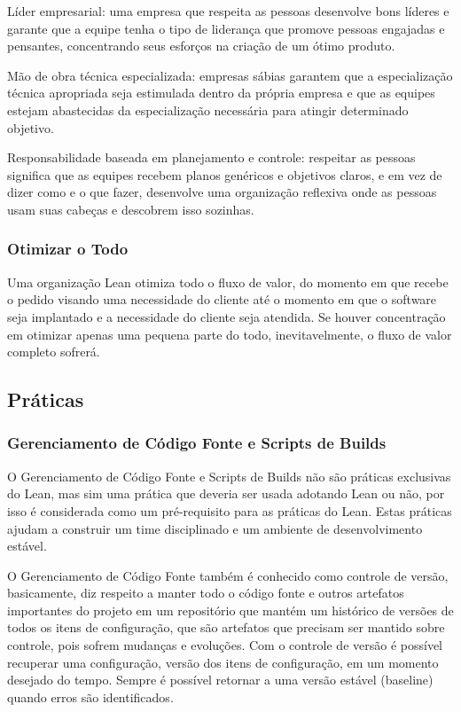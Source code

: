 Líder empresarial: uma empresa que respeita as pessoas desenvolve bons líderes e garante que a equipe tenha o tipo de liderança que promove pessoas engajadas e pensantes, concentrando seus esforços na criação de um ótimo produto.

Mão de obra técnica especializada: empresas sábias garantem que a especialização técnica apropriada seja estimulada dentro da própria empresa e que as equipes estejam abastecidas da especialização necessária para atingir determinado objetivo.

Responsabilidade baseada em planejamento e controle: respeitar as pessoas significa que as equipes recebem planos genéricos e objetivos claros, e em vez de dizer como e o que fazer, desenvolve uma organização reflexiva onde as pessoas usam suas cabeças e descobrem isso sozinhas.

\subsubsection[Otimizar o Todo]{Otimizar o Todo}

Uma organização Lean otimiza todo o fluxo de valor, do momento em que recebe o pedido visando uma necessidade do cliente até o momento em que o software seja implantado e a necessidade do cliente seja atendida. Se houver concentração em otimizar apenas uma pequena parte do todo, inevitavelmente, o fluxo de valor completo sofrerá. 

\subsection[ Práticas]{ Práticas}

\subsubsection[Gerenciamento de Código Fonte e Scripts de Builds]{Gerenciamento de Código Fonte e Scripts de Builds}

O Gerenciamento de Código Fonte e Scripts de Builds não são práticas exclusivas do Lean, mas sim uma prática que deveria ser usada adotando Lean ou não, por isso é considerada como um pré-requisito para as práticas do Lean. Estas práticas ajudam a construir um time disciplinado e um ambiente de desenvolvimento estável.

O Gerenciamento de Código Fonte também é conhecido como controle de versão, basicamente, diz respeito a manter todo o código fonte e outros artefatos importantes do projeto em um repositório que mantém um histórico de versões de todos os itens de configuração, que são artefatos que precisam ser mantido sobre controle, pois sofrem mudanças e evoluções. Com o controle de versão é possível recuperar uma configuração, versão dos itens de configuração, em um momento desejado do tempo. Sempre é possível retornar a uma versão estável (baseline) quando erros são identificados.

